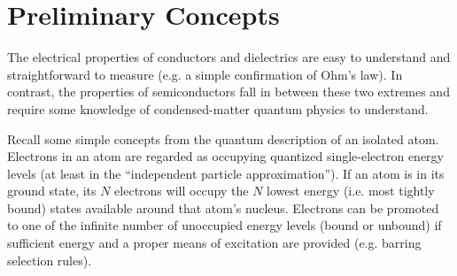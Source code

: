 \documentclass{../lab}
\begin{document}
\section{Preliminary Concepts}

The electrical properties of conductors and dielectrics are easy to understand and straightforward to measure (e.g. a simple confirmation of Ohm's law). In contrast, the properties of semiconductors fall in between these two extremes and require some knowledge of condensed-matter quantum physics to understand.

Recall some simple concepts from the quantum description of an isolated atom. Electrons in an atom are regarded as occupying quantized single-electron energy levels (at least in the ``independent particle approximation''). If an atom is in its ground state, its $N$ electrons will occupy the $N$ lowest energy (i.e. most tightly bound) states available around that atom's nucleus. Electrons can be promoted to one of the infinite number of unoccupied energy levels (bound or unbound) if sufficient energy and a proper means of excitation are provided (e.g. barring selection rules).
\end{document}
